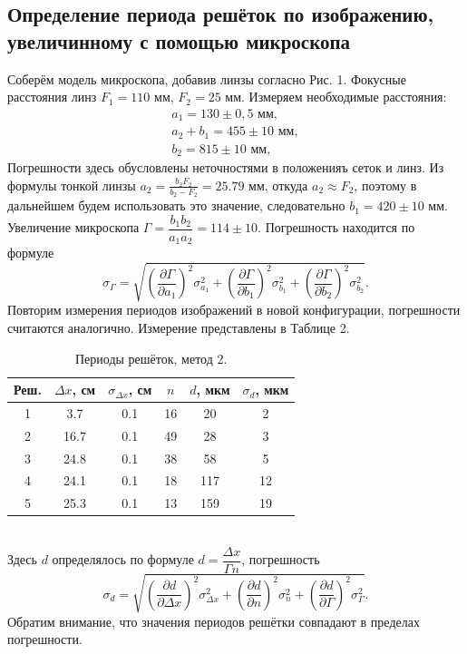 \documentclass[a4paper,12pt]{article}
\begin{document}
\subsection{Определение периода решёток по изображению, увеличинному с помощью микроскопа}
Соберём модель микроскопа, добавив линзы согласно Рис. 1. Фокусные расстояния линз $F_1 = 110 \text{ мм}$, $F_2 = 25 \text{ мм}$. Измеряем необходимые расстояния:
$$
\begin{array}{r}
a_1 = 130 \pm 0,5 \text{ мм},\\
a_2 + b_1 = 455 \pm 10 \text{  мм},\\
b_2 = 815 \pm 10 \text{ мм},
\end{array}
$$
Погрешности здесь обусловлены неточностями в положенияъ сеток и линз. Из формулы тонкой линзы $a_2 = \frac{b_2 F_2}{b_2 - F_2} = 25.79 \text{ мм}$, откуда $a_2 \approx F_2$, поэтому в дальнейшем будем использовать это значение, следовательно $b_1 = 420 \pm 10 \text{ мм}$. \\
Увеличение микроскопа $\Gamma = \dfrac{b_1 b_2}{a_1 a_2} = 114 \pm 10$. Погрешность находится по формуле
$$
\sigma_\Gamma = \sqrt{\left(\dfrac{\partial \Gamma}{\partial a_1}\right)^2 \sigma^2_{a_1} + \left(\dfrac{\partial \Gamma}{\partial b_1}\right)^2 \sigma^2_{b_1} + \left(\dfrac{\partial \Gamma}{\partial b_2}\right)^2 \sigma^2_{b_2}}.
$$
Повторим измерения периодов изображений в новой конфигурации, погрешности считаются аналогично. Измерение представлены в Таблице 2.
\begin{table}[h]
\begin{tabular}{|c|c|c|c|c|c|}
\hline
Реш. & $\Delta x$, см & $\sigma_{\Delta x}$, см & $n$ & $d$, мкм & $\sigma_d$, мкм \\ \hline
1     & 3.7            & 0.1                     & 16  & 20       & 2               \\ \hline
2     & 16.7           & 0.1                     & 49  & 28       & 3               \\ \hline
3     & 24.8           & 0.1                     & 38  & 58       & 5               \\ \hline
4     & 24.1           & 0.1                     & 18  & 117      & 12              \\ \hline
5     & 25.3           & 0.1                     & 13  & 159      & 19              \\ \hline
\end{tabular}
\centering
\caption{Периоды решёток, метод 2.}
\end{table}\\
Здесь $d$ определялось по формуле $d = \dfrac{\Delta x}{\Gamma n}$, погрешность
$$
\sigma_d = \sqrt{\left(\dfrac{\partial d}{\partial \Delta x}\right)^2 \sigma^2_{\Delta x} + \left(\dfrac{\partial d}{\partial n}\right)^2 \sigma^2_{n} + \left(\dfrac{\partial d}{\partial \Gamma}\right)^2 \sigma^2_{\Gamma}}.
$$
Обратим внимание, что значения периодов решётки совпадают в пределах погрешности.
\end{document}
